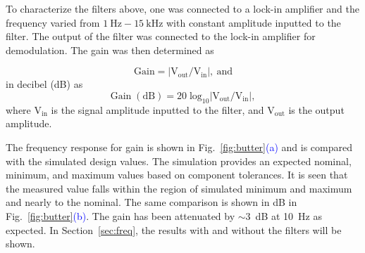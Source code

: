 To characterize the filters above, one was connected to a lock-in amplifier and the frequency varied from $\mathrm{1~Hz-15~kHz}$ with constant amplitude inputted to the filter. The output of the filter was connected to the lock-in amplifier for demodulation. The gain was then determined as 

\begin{equation}\label{eq:filter_gain}
    \mathrm{Gain=|V_{out}/V_{in}|,~and}
\end{equation}
in decibel (dB) as
\begin{equation}\label{eq:filter_gain_db}
    \mathrm{Gain\;(dB)=20\;log_{10}|V_{out}/V_{in}|,}
\end{equation}
where $\mathrm{V_{in}}$ is the signal amplitude inputted to the filter, and $\mathrm{V_{out}}$ is the output amplitude.


The frequency response for gain is shown in Fig.~\ref{fig:butter}\textcolor{blue}{(a)} and is compared with the simulated design values. The simulation provides an expected nominal, minimum, and maximum values based on component tolerances. It is seen that the measured value falls within the region of simulated minimum and maximum and nearly to the nominal. The same comparison is shown in dB in Fig.~\ref{fig:butter}\textcolor{blue}{(b)}. The gain has been attenuated by $\sim3$~dB at 10~Hz as expected. In Section~\ref{sec:freq}, the results with and without the filters will be shown. 








